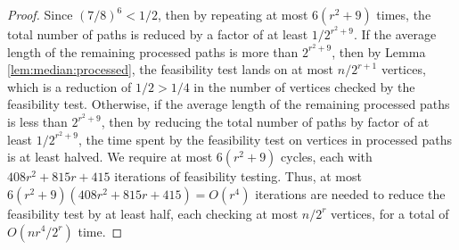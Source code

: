 \begin{proof}
Since $(7/8)^6<1/2$, then by repeating at most $6(r^2+9)$ times, the total number of paths is reduced by a factor of at least $1/2^{r^2+9}$. 
If the average length of the remaining processed paths is more than $2^{r^2+9}$, then by Lemma \ref{lem:median:processed}, the feasibility test lands on at most $n/2^{r+1}$ vertices, which is a reduction of $1/2>1/4$ in the number of vertices checked by the feasibility test. 
Otherwise, if the average length of the remaining processed paths is less than $2^{r^2+9}$, then by reducing the total number of paths by factor of at least $1/2^{r^2+9}$, the time spent by the feasibility test on vertices in processed paths is at least halved. 
We require at most $6(r^2+9)$ cycles, each with $408r^2+815r+415$ iterations of feasibility testing. 
Thus, at most $6(r^2+9)(408r^2+815r+415)=O(r^4)$ iterations are needed to reduce the feasibility test by at least half, each checking at most $n/2^r$ vertices, for a total of $O(nr^4/2^r)$ time.
\end{proof}

